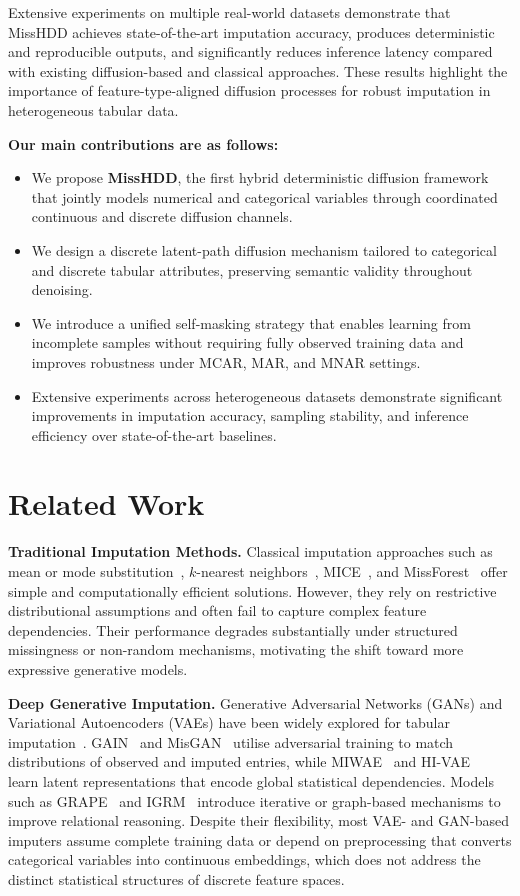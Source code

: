 \documentclass[times, review, 10pt]{elsarticle}
\begin{document}
Extensive experiments on multiple real-world datasets demonstrate that MissHDD achieves state-of-the-art imputation accuracy, produces deterministic and reproducible outputs, and significantly reduces inference latency compared with existing diffusion-based and classical approaches. These results highlight the importance of feature-type-aligned diffusion processes for robust imputation in heterogeneous tabular data.

\textbf{Our main contributions are as follows:}
\begin{itemize}
\item We propose \textbf{MissHDD}, the first hybrid deterministic diffusion framework that jointly models numerical and categorical variables through coordinated continuous and discrete diffusion channels.
\item We design a discrete latent-path diffusion mechanism tailored to categorical and discrete tabular attributes, preserving semantic validity throughout denoising.
\item We introduce a unified self-masking strategy that enables learning from incomplete samples without requiring fully observed training data and improves robustness under MCAR, MAR, and MNAR settings.
\item Extensive experiments across heterogeneous datasets demonstrate significant improvements in imputation accuracy, sampling stability, and inference efficiency over state-of-the-art baselines.
\end{itemize}

\section{Related Work}

\textbf{Traditional Imputation Methods.}
Classical imputation approaches such as mean or mode substitution~\cite{mean,mean2}, $k$-nearest neighbors~\cite{knn}, MICE~\cite{mice}, and MissForest~\cite{missforest} offer simple and computationally efficient solutions. However, they rely on restrictive distributional assumptions and often fail to capture complex feature dependencies. Their performance degrades substantially under structured missingness or non-random mechanisms, motivating the shift toward more expressive generative models.

\textbf{Deep Generative Imputation.}
Generative Adversarial Networks (GANs) and Variational Autoencoders (VAEs) have been widely explored for tabular imputation~\cite{lopez2019variational}. GAIN~\cite{yoon2018gain} and MisGAN~\cite{misGAN} utilise adversarial training to match distributions of observed and imputed entries, while MIWAE~\cite{mattei2019miwae} and HI-VAE~\cite{hivae} learn latent representations that encode global statistical dependencies. Models such as GRAPE~\cite{grape} and IGRM~\cite{igrm} introduce iterative or graph-based mechanisms to improve relational reasoning. Despite their flexibility, most VAE- and GAN-based imputers assume complete training data or depend on preprocessing that converts categorical variables into continuous embeddings, which does not address the distinct statistical structures of discrete feature spaces.
\end{document}
